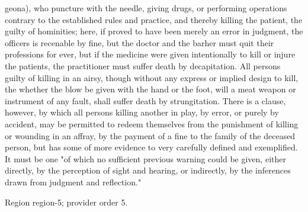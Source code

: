 \documentclass[11pt]{article}
\begin{document}
geona), who puncture with the needle, giving drugs, or performing operations contrary to the established rules and practice, and thereby killing the patient, the guilty of hominities; here, if proved to have been merely an error in judgment, the officers is recenable by fine, but the doctor and the barher must quit their professions for ever, but if the medicine were given intentionally to kill or injure the patients, the practitioner must suffer death by decapitation. All persons guilty of killing in an airsy, though without any express or implied design to kill, the whether the blow be given with the hand or the foot, will a meat weapon or instrument of any fault, shall suffer death by strungitation. There is a clause, however, by which all persons killing another in play, by error, or purely by accident, may be permitted to redeem themselves from the punishment of killing or wounding in an affray, by the payment of a fine to the family of the deceased person, but has some of more evidence to very carefully defined and exemplified. It must be one "of which no sufficient previous warning could be given, either directly, by the perception of sight and hearing, or indirectly, by the inferences drawn from judgment and reflection."
\par

{\scriptsize\color{gray} Region region-5; provider order 5.\par}
\medskip
\end{document}
